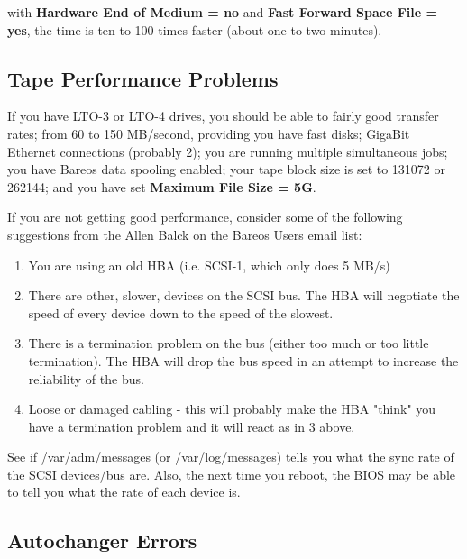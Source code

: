 {\begin{description}
  with {\bf Hardware End of Medium = no} and
{\bf Fast Forward Space File = yes}, the time is ten to
100 times faster (about one to two minutes).

\end{description}

\subsection{Tape Performance Problems}
If you have LTO-3 or LTO-4 drives, you should be able to
fairly good transfer rates; from 60 to 150 MB/second, providing
you have fast disks; GigaBit Ethernet connections (probably 2); you are
running multiple simultaneous jobs; you have Bareos data spooling
enabled; your tape block size is set to 131072 or 262144; and
you have set {\bf Maximum File Size = 5G}.

If you are not getting good performance, consider some of the following
suggestions from the Allen Balck on the Bareos Users email list:

\begin{enumerate}
\item You are using an old HBA (i.e. SCSI-1, which only does 5 MB/s)

\item There are other, slower, devices on the SCSI bus. The HBA will
   negotiate the speed of every device down to the speed of the
   slowest.

\item There is a termination problem on the bus (either too much or
   too little termination). The HBA will drop the bus speed in an
   attempt to increase the reliability of the bus.

\item Loose or damaged cabling - this will probably make the HBA "think"
   you have a termination problem and it will react as in 3 above.
\end{enumerate}

See if /var/adm/messages (or /var/log/messages) tells you what the sync
rate of the SCSI devices/bus are. Also, the next time you reboot, the
BIOS may be able to tell you what the rate of each device is.


\subsection{Autochanger Errors}

}
